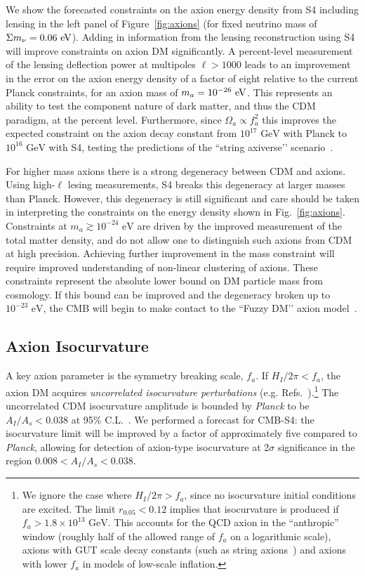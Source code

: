 We show the forecasted constraints on the axion energy density from S4 including lensing in the left panel of Figure~\ref{fig:axions} (for fixed neutrino mass of $\Sigma m_\nu = 0.06~\rm{eV}$). Adding in information from the lensing reconstruction using S4 will improve constraints on axion DM significantly. A percent-level measurement of the lensing deflection power at multipoles $\ell > 1000$ leads to an improvement in the error on the axion energy density of a factor of eight relative to the current Planck constraints, for an axion mass of $m_a=10^{-26}~{\rm eV}$.    This represents an ability to test the component nature of dark matter, and thus the CDM paradigm, at the percent level. Furthermore, since $\Omega_a\propto f_a^2$ this improves the expected constraint on the axion decay constant from $10^{17}\text{ GeV}$ with Planck to $10^{16}\text{ GeV}$ with S4, testing the predictions of the ``string axiverse’’ scenario~\cite{axiverse}. 

For higher mass axions there is a strong degeneracy between CDM and axions. Using high-$\ell$ lesing measurements, S4 breaks this degeneracy at larger masses than Planck. However, this degeneracy is still significant and care should be taken in interpreting the constraints on the energy density shown in Fig.~\ref{fig:axions}. Constraints at $m_a\gtrsim 10^{-24}\text{ eV}$ are driven by the improved measurement of the total matter density, and do not allow one to distinguish such axions from CDM at high precision.  Achieving further improvement in the mass constraint will require improved understanding of non-linear clustering of axions. These constraints represent the absolute lower bound on DM particle mass from cosmology. If this bound can be improved and the degeneracy broken up to $10^{-23}\text{ eV}$, the CMB will begin to make contact to the ``Fuzzy DM’’ axion model~\cite{hu:00a, marsh:2013js}. 


\subsection{Axion Isocurvature}

A key axion parameter is the symmetry breaking scale, $f_a$. If $H_I/2\pi<f_a$, the axion DM acquires \emph{uncorrelated isocurvature perturbations} (e.g. Refs.~\cite{Axenides:1983hj,Fox:2004kb,Hertzberg:2008wr}).\footnote{We ignore the case where $H_I/2\pi>f_a$, since no isocurvature initial conditions are excited. The limit $r_{0.05}<0.12$ implies that isocurvature is produced if $f_a>1.8\times 10^{13}\text{ GeV}$. This accounts for the QCD axion in the ``anthropic'' window (roughly half of the allowed range of $f_a$ on a logarithmic scale), axions with GUT scale decay constants (such as string axions~\cite{Svrcek:2006yi,Arvanitaki:2009fg}) and axions with lower $f_a$ in models of low-scale inflation.} The uncorrelated CDM isocurvature amplitude is bounded by \emph{Planck} to be $A_I/A_s<0.038$ at 95\% C.L.~\cite{Ade:2015lrj}. We performed a forecast for CMB-S4: the isocurvature limit will be improved by a factor of approximately five compared to \emph{Planck}, allowing for detection of axion-type isocurvature at 2$\sigma$ significance in the region $0.008<A_I/A_s<0.038$.

